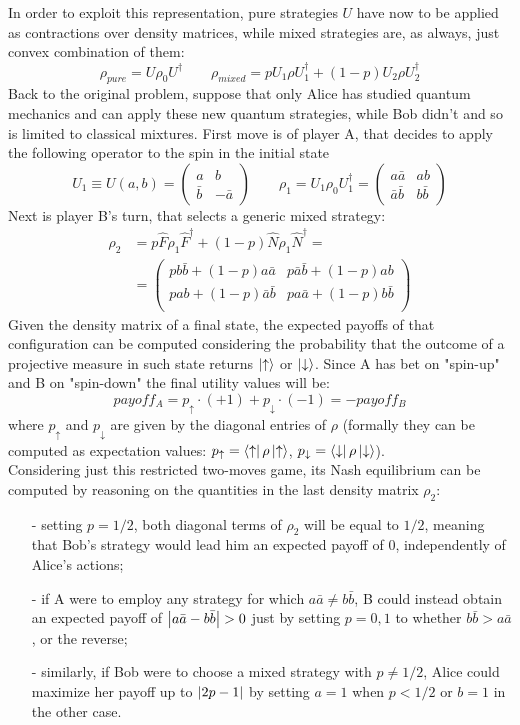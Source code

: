 In order to exploit this representation, pure strategies $U$ have now to be applied as contractions over density matrices, while mixed strategies are, as always, just convex combination of them:
\[ \rho_{pure} = U\rho_0U^\dagger \qquad \rho_{mixed}=pU_1\rho U_1^\dagger+(1-p)U_2\rho U_2^\dagger \]
Back to the original problem, suppose that only Alice has studied quantum mechanics and can apply these new quantum strategies, while Bob didn't and so is limited to classical mixtures. First move is of player A, that decides to apply the following operator to the spin in the initial state
\[ U_1 \equiv U(a,b) = \begin{pmatrix} a&b\\\bar{b}&-\bar{a}\end{pmatrix} \qquad \rho_1 = U_1\rho_0U_1^\dagger = \begin{pmatrix} a\bar{a}&ab\\\bar{a}\bar{b}&b\bar{b}\end{pmatrix} \]
Next is player B's turn, that selects a generic mixed strategy:
\[ \begin{aligned} \rho_2 &= p\hat{F}\rho_1\hat{F}^\dagger + (1-p)\hat{N}\rho_1\hat{N}^\dagger =\\
&= \begin{pmatrix} pb\bar{b}+(1-p)a\bar{a}&p\bar{a}\bar{b}+(1-p)ab\\ pab +(1-p)\bar{a}\bar{b}&pa\bar{a}+(1-p)b\bar{b}\\ \end{pmatrix} \end{aligned} \]
Given the density matrix of a final state, the expected payoffs of that configuration can be computed considering the probability that the outcome of a projective measure in such state returns $\ket{\uparrow}$ or $\ket{\downarrow}$. Since A has bet on "spin-up" and B on "spin-down" the final utility values will be:
\[ payoff_A = p_\uparrow\cdot(+1) + p_\downarrow\cdot(-1) = -payoff_B \]
where $p_\uparrow$ and $p_\downarrow$ are given by the diagonal entries of $\rho$ (formally they can be computed as expectation values: $p_\uparrow=\bra{\uparrow}\rho\ket{\uparrow}$, $p_\downarrow=\bra{\downarrow}\rho\ket{\downarrow}$).\\
Considering just this restricted two-moves game, its Nash equilibrium can be computed by reasoning on the quantities in the last density matrix $\rho_2$:
\begin{itemize}[noitemsep]
	\item[-] setting $p=1/2$, both diagonal terms of $\rho_2$ will be equal to $1/2$, meaning that Bob's strategy would lead him an expected payoff of 0, independently of Alice's actions;
	\item[-] if A were to employ any strategy for which $a\bar{a}\neq b\bar{b}$, B could instead obtain an expected payoff of $\abs{a\bar{a}-b\bar{b}}>0$ just by setting $p=0,1$ to whether $b\bar{b}> a\bar{a}$, or the reverse;
	\item[-] similarly, if Bob were to choose a mixed strategy with $p\neq 1/2$, Alice could maximize her payoff up to $\abs{2p-1}$ by setting $a=1$ when $p<1/2$ or $b=1$ in the other case. 
\end{itemize}
